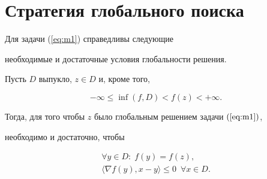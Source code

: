 \section{Стратегия глобального поиска}





Для задачи (\ref{eq:m1}) справедливы следующие


необходимые и достаточные условия глобальности решения.





\begin{thm}


\label{Theorem1}


Пусть $D$ выпукло, $z \in D$ и, кроме того,


\begin{equation}


-\infty \leq \inf (f,D)< f(z)< +\infty.


\label{eq:m8}


\end{equation}


Тогда, для того чтобы $z$ было глобальным решением задачи $(\ref{eq:m1})$,


необходимо и достаточно, чтобы


\begin{equation}


\begin{array}{c}


\forall y \in D: \; f(y)=f(z),\\[2mm]


\langle \nabla f(y), x-y \rangle \leq 0 \ \; \forall x \in D.


\end{array}


\label{eq:m9}


\end{equation}


\end{thm} 





